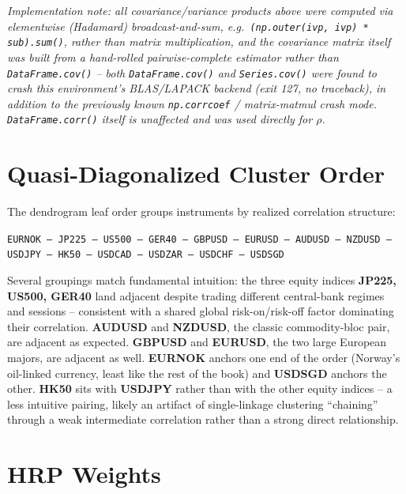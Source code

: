 \documentclass[11pt]{article}
\begin{document}
\textit{Implementation note: all covariance/variance products above were computed via
elementwise (Hadamard) broadcast-and-sum, e.g.\ \texttt{(np.outer(ivp, ivp) *
sub).sum()}, rather than matrix multiplication, and the covariance matrix itself was
built from a hand-rolled pairwise-complete estimator rather than
\texttt{DataFrame.cov()} -- both \texttt{DataFrame.cov()} and \texttt{Series.cov()}
were found to crash this environment's BLAS/LAPACK backend (exit 127, no traceback),
in addition to the previously known \texttt{np.corrcoef} / matrix-matmul crash mode.
\texttt{DataFrame.corr()} itself is unaffected and was used directly for $\rho$.}

\section{Quasi-Diagonalized Cluster Order}

The dendrogram leaf order groups instruments by realized correlation structure:

\begin{center}
\texttt{EURNOK -- JP225 -- US500 -- GER40 -- GBPUSD -- EURUSD -- AUDUSD -- NZDUSD -- USDJPY -- HK50 -- USDCAD -- USDZAR -- USDCHF -- USDSGD}
\end{center}

Several groupings match fundamental intuition: the three equity indices \textbf{JP225,
US500, GER40} land adjacent despite trading different central-bank regimes and
sessions -- consistent with a shared global risk-on/risk-off factor dominating their
correlation. \textbf{AUDUSD} and \textbf{NZDUSD}, the classic commodity-bloc pair, are
adjacent as expected. \textbf{GBPUSD} and \textbf{EURUSD}, the two large European
majors, are adjacent as well. \textbf{EURNOK} anchors one end of the order (Norway's
oil-linked currency, least like the rest of the book) and \textbf{USDSGD} anchors the
other. \textbf{HK50} sits with \textbf{USDJPY} rather than with the other equity
indices -- a less intuitive pairing, likely an artifact of single-linkage clustering
``chaining'' through a weak intermediate correlation rather than a strong direct
relationship.

\section{HRP Weights}
\end{document}
